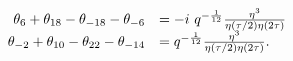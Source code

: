 \begin{equation} \label{++--}
  \begin{array}{rl}
    \theta_6 + \theta_{18} - \theta_{-18} - \theta_{-6} &= -i
    ~q^{-{1\over 12}} {\eta^3\over \eta(\tau/2) \eta(2\tau)}\\
\theta_{-2} + \theta_{10} - \theta_{22} - \theta_{-14} &= 
    q^{-{1\over 12}} {\eta^3\over \eta(\tau/2) \eta(2\tau)}.
  \end{array}
\end{equation}

